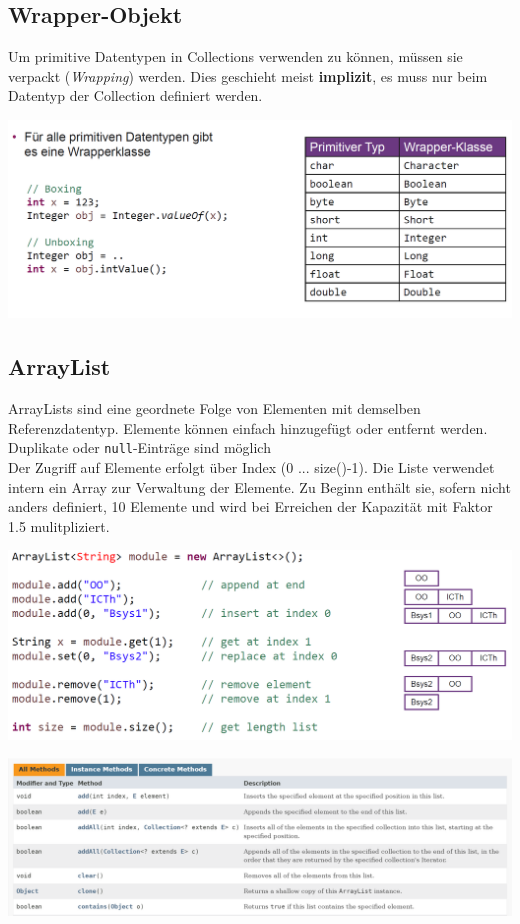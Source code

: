 \subsection{Wrapper-Objekt}
Um primitive Datentypen in Collections verwenden zu können, müssen sie verpackt (\textit{Wrapping}) werden. Dies geschieht
meist \textbf{implizit}, es muss nur beim Datentyp der Collection definiert werden.
\begin{center}
    \includegraphics[width=\columnwidth]{pictures/wrapper-klassen.png}
\end{center}

\subsection{ArrayList}
ArrayLists sind eine geordnete Folge von Elementen mit demselben Referenzdatentyp. Elemente können einfach 
hinzugefügt oder entfernt werden. Duplikate oder \verb|null|-Einträge sind möglich\\
Der Zugriff auf Elemente erfolgt über Index (0 ... size()-1). Die Liste verwendet intern ein Array zur Verwaltung der Elemente.
Zu Beginn enthält sie, sofern nicht anders definiert, 10 Elemente und wird bei Erreichen der Kapazität mit Faktor 1.5 mulitpliziert.

\begin{center}
    \includegraphics[width=0.78\columnwidth]{pictures/arrayList-bsp.png}
\end{center}

\begin{center}
    \includegraphics[width=0.82\columnwidth]{pictures/arrayList-api.png}
\end{center}

